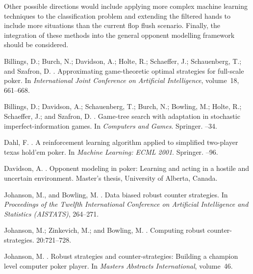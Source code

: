 \documentclass[letterpaper]{article}
\begin{document}
Other possible directions would include applying more complex machine learning techniques to the classification problem and extending the filtered hands to include more situations than the current flop flush scenario. Finally, the integration of these methods into the general opponent modelling framework should be considered.

\begin{thebibliography}{}

Billings, D.; Burch, N.; Davidson, A.; Holte, R.; Schaeffer, J.; Schauenberg,
  T.; and Szafron, D.
.
\newblock Approximating game-theoretic optimal strategies for full-scale poker.
\newblock In {\em International Joint Conference on Artificial Intelligence},
  volume~18,  661--668.

Billings, D.; Davidson, A.; Schauenberg, T.; Burch, N.; Bowling, M.; Holte, R.;
  Schaeffer, J.; and Szafron, D.
.
\newblock Game-tree search with adaptation in stochastic imperfect-information
  games.
\newblock In {\em Computers and Games}. Springer.
--34.

Dahl, F.
.
\newblock A reinforcement learning algorithm applied to simplified two-player
  texas hold’em poker.
\newblock In {\em Machine Learning: ECML 2001}. Springer.
--96.

Davidson, A.
.
\newblock Opponent modeling in poker: Learning and acting in a hostile and
  uncertain environment.
\newblock Master's thesis, University of Alberta, Canada.

Johanson, M., and Bowling, M.
.
\newblock Data biased robust counter strategies.
\newblock In {\em Proceedings of the Twelfth International Conference on
  Artificial Intelligence and Statistics (AISTATS)},  264--271.

Johanson, M.; Zinkevich, M.; and Bowling, M.
.
\newblock Computing robust counter-strategies.
 20:721--728.

Johanson, M.
.
\newblock Robust strategies and counter-strategies: Building a champion level
  computer poker player.
\newblock In {\em Masters Abstracts International}, volume~46.


\end{thebibliography}
\end{document}
